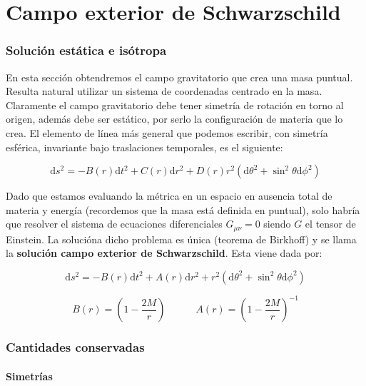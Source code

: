 \documentclass[12pt,a4paper]{book}
\numberwithin{equation}{section}
\numberwithin{figure}{section}
\newcommand{\parentesis}[1]{\left( #1  \right)}
\newcommand{\D}{\mathrm{d}}
\newcommand{\tquad}{\quad \quad \quad}
\begin{document}
\chapter{Campo exterior de Schwarzschild}

\subsection{Solución estática e isótropa}


En esta sección obtendremos el campo gravitatorio que crea una masa puntual. Resulta natural utilizar un sistema de coordenadas centrado en la masa. Claramente el campo gravitatorio debe tener simetría de rotación en torno al origen, además debe ser estático, por serlo la configuración de materia que lo crea. El elemento de línea más general que podemos escribir, con simetría esférica, invariante bajo traslaciones temporales, es el siguiente:

\begin{equation}
\D s^2 = - B(r) \D t^2 + C(r) \D r^2 + D(r) r^2(\D \theta^2 + \sin^2 \theta \D \phi^2) 
\end{equation}

Dado que estamos evaluando la métrica en un espacio en ausencia total de materia y energía (recordemos que la masa está definida en puntual), solo habría que resolver el sistema de ecuaciones diferenciales $G_{\mu \nu} = 0$ siendo $G$ el tensor de Einstein. La solucióna dicho problema es única (teorema de Birkhoff) y se llama la \textbf{solución campo exterior de Schwarzschild}. Esta viene dada por:


\begin{equation}
\D s^2 = - B(r) \D t^2 + A(r) \D r^2 + r^2(\D \theta^2 + \sin^2 \theta \D \phi^2) 
\label{Ec:04.002-Schwarzschild}
\end{equation}

\begin{equation}
B(r) =\parentesis{1-\frac{2M}{r}} \tquad A(r) = \parentesis{1-\frac{2M}{r}}^{-1}
\end{equation}

\subsection{Cantidades conservadas}

\subsubsection{Simetrías}
\end{document}
